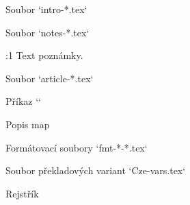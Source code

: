 \def\printedbooks{Da} 
\processbooks %
\bye
\endtt

 

 Soubor `intro-*.tex`

 Soubor `notes-*.tex`

\begtt
:1 {} %
        Text poznámky.
\endtt




 Soubor `article-*.tex`

 Příkaz `\putCite`

 Popis map

 Formátovací soubory `fmt-*-*.tex`

 Soubor překladových variant `Cze-vars.tex`






\vfill\eject

\sec Rejstřík

\def\_sortinglang{en}
\typosize[9/]
\makeindex
\endmulti

\bye
